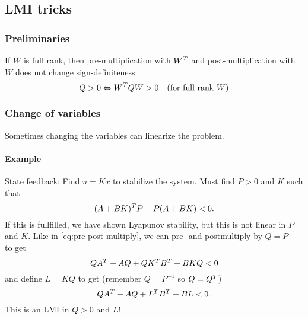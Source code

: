 \subsection{LMI tricks}
\subsubsection{Preliminaries}
If $W$ is full rank, then pre-multiplication with $W^{T}$ and post-multiplication with $W$ does not change sign-definiteness:
%
\begin{equation}\label{eq:pre-post-multiply}
  Q > 0 \Leftrightarrow W^{T} Q W > 0 \quad (\mbox{for full rank } W)
\end{equation}

\subsubsection{Change of variables}\label{sssec:change-of-variables}
Sometimes changing the variables can linearize the problem.
\paragraph{Example} State feedback: Find $u = Kx$ to stabilize the system. Must find $P > 0$ and $K$ such that
%
\begin{equation}
  (A + BK)^{T} P + P(A + BK) < 0.
\end{equation}
%
If this is fullfilled, we have shown Lyapunov stability, but this is not linear in $P$ and $K$. Like in \eqref{eq:pre-post-multiply}, we can pre- and postmultiply by $Q = P^{-1}$ to get
%
\begin{equation}
  QA^{T} + AQ + QK^{T} B^{T} + BKQ < 0
\end{equation}
%
and define $L = KQ$ to get (remember $Q = P^{-1}$ so $Q = Q^{T}$)
%
\begin{equation}
  QA^{T} + AQ + L^{T} B^{T} + BL < 0.
\end{equation}
%
This is an LMI in $Q > 0$ and $L$!

